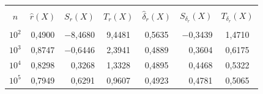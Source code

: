 \begin{table}\small %


\begin{center}




\vspace*{2ex}





\tabcolsep=11.6pt


\begin{tabular}{|c|c|r|c|c|r|c|}


\hline


&&&&&&\\[-9pt]


$n$& ${\hat r}(X)$& \multicolumn{1}{c|}{$S_r(X)$}& $T_r(X)$& ${\hat \delta}_r(X)$& 


\multicolumn{1}{c|}{$S_{\delta_r}(X)$}& $T_{\delta_r}(X)$\\[2pt]


\hline


&&&&&&\\[-9pt]


$10^2$& 0{,}4900& $-$8{,}4680& 9{,}4481& 0{,}5635& $-$0{,}3439& 1{,}4710\\


$10^3$& 0{,}8747& $-$0{,}6446& 2{,}3941& 0{,}4889& 0{,}3604& 0{,}6175\\


$10^4$& 0{,}8298& 0{,}3268& 1{,}3328& 0{,}4895& 0{,}4468& 0{,}5322\\


$10^5$& 0{,}7949& 0{,}6291& 0{,}9607& 0{,}4923& 0{,}4781& 0{,}5065\\


\hline


\end{tabular}


\end{center}


\end{table}








